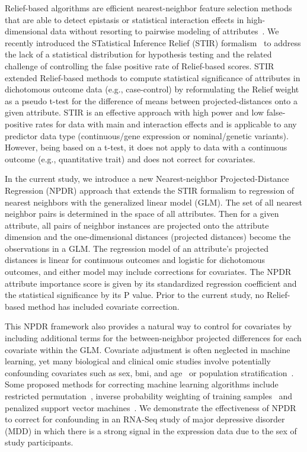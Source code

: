\documentclass{bioinfo}
\begin{document}
Relief-based algorithms are efficient nearest-neighbor feature selection methods that are able to detect epistasis or statistical interaction effects in high-dimensional data without resorting to pairwise modeling of attributes~\citep{urbanowicz17b, kononenko97, mckinney09, robnik03}.
We recently introduced the STatistical Inference Relief (STIR) formalism~\citep{stir} to address the lack of a statistical distribution for hypothesis testing and the related challenge of controlling the false positive rate of Relief-based scores.
STIR extended Relief-based methods to compute statistical significance of attributes in dichotomous outcome data (e.g., case-control) by reformulating the Relief weight~\citep{mckinney13} as a pseudo t-test for the difference of means between projected-distances onto a given attribute.
STIR is an effective approach with high power and low false-positive rates for data with main and interaction effects and is applicable to any predictor data type (continuous/gene expression or nominal/genetic variants).
However, being based on a t-test, it does not apply to data with a continuous outcome (e.g., quantitative trait) and does not correct for covariates.

In the current study, we introduce a new Nearest-neighbor Projected-Distance Regression (NPDR) approach that extends the STIR formalism to regression of nearest neighbors with the generalized linear model (GLM). The set of all nearest neighbor pairs is determined in the space of all attributes. Then for a given attribute, all pairs of neighbor instances are projected onto the attribute dimension and the one-dimensional distances (projected distances) become the observations in a GLM.  
The regression model of an attribute's projected distances is linear for continuous outcomes and logistic for dichotomous outcomes, and either model may include corrections for covariates.
The NPDR attribute importance score is given by its standardized regression coefficient and the statistical significance by its P value.
Prior to the current study, no Relief-based method has included covariate correction.

This NPDR framework also provides a natural way to control for covariates by including additional terms for the between-neighbor projected differences for each covariate within the GLM.
Covariate adjustment is often neglected in machine learning, yet many biological and clinical omic studies involve potentially confounding covariates such as sex, bmi, and age~\citep{le18_brainagesim} or population stratification~\citep{popstrat16}.
Some proposed methods for correcting machine learning algorithms include restricted permutation~\citep{rao2017}, inverse probability weighting of training samples~\citep{linn2016} and penalized support vector machines~\citep{li2011ccsvm}.
We demonstrate the effectiveness of NPDR to correct for confounding in an RNA-Seq study of major depressive disorder (MDD) in which there is a strong signal in the expression data due to the sex of study participants\citep{mostafavi14}.
\end{document}
